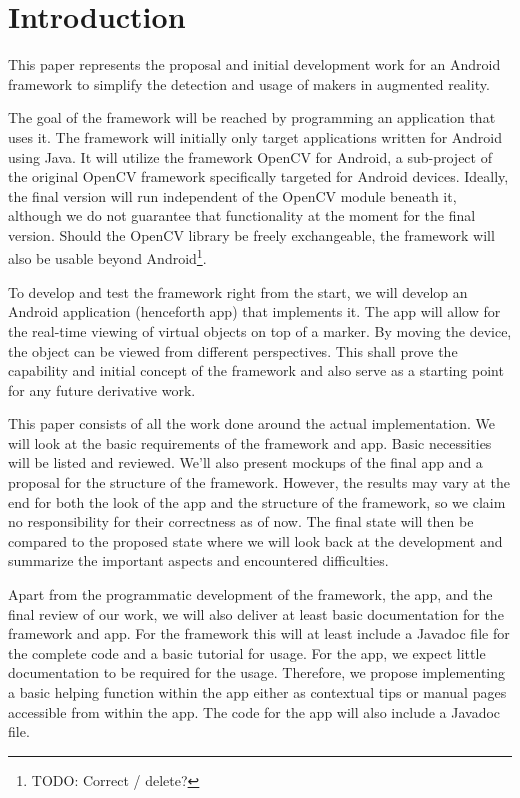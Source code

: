 \section{Introduction}

This paper represents the proposal and initial development work for an Android framework to simplify the detection and usage of makers in augmented reality.

The goal of the framework will be reached by programming an application that uses it.
The framework will initially only target applications written for Android\cite{android} using Java.
It will utilize the framework OpenCV for Android\cite{opencvandroid}, a sub-project of the original OpenCV framework\cite{opencv} specifically targeted for Android devices.
Ideally, the final version will run independent of the OpenCV module beneath it, although we do not guarantee that functionality at the moment for the final version.
Should the OpenCV library be freely exchangeable, the framework will also be usable beyond Android\footnote{TODO: Correct / delete?}.

To develop and test the framework right from the start, we will develop an Android application (henceforth app) that implements it.
The app will allow for the real-time viewing of virtual objects on top of a marker.
By moving the device, the object can be viewed from different perspectives.
This shall prove the capability and initial concept of the framework and also serve as a starting point for any future derivative work.

This paper consists of all the work done around the actual implementation.
We will look at the basic requirements of the framework and app.
Basic necessities will be listed and reviewed.
We'll also present mockups of the final app and a proposal for the structure of the framework.
However, the results may vary at the end for both the look of the app and the structure of the framework, so we claim no responsibility for their correctness as of now.
The final state will then be compared to the proposed state where we will look back at the development and summarize the important aspects and encountered difficulties.

Apart from the programmatic development of the framework, the app, and the final review of our work, we will also deliver at least basic documentation for the framework and app.
For the framework this will at least include a Javadoc\cite{docjava} file for the complete code and a basic tutorial for usage.
For the app, we expect little documentation to be required for the usage.
Therefore, we propose implementing a basic helping function within the app either as contextual tips or manual pages accessible from within the app.
The code for the app will also include a Javadoc file.

